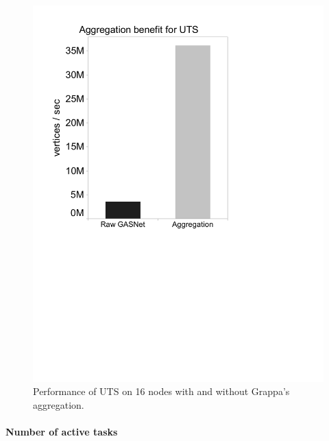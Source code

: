 \begin{figure}[htb]
\begin{center}
  \includegraphics[width=0.95\columnwidth]{figs/no_aggregation_uts.pdf}
\begin{minipage}{0.95\columnwidth}
  \caption{\label{fig:no-aggregation-uts} Performance of UTS on 16
      nodes with and without Grappa's aggregation.}
\end{minipage}
\vspace{-3ex}
\end{center}
\end{figure}

\paragraph{Number of active tasks}


